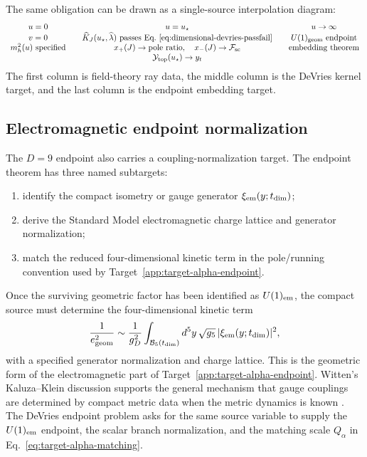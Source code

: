 The same obligation can be drawn as a single-source interpolation diagram:
\begin{equation}
\begin{array}{ccccc}
u=0 && u=u_\star && u\to\infty\\
v=0 && \widehat K_J(u_\star,\widehat\lambda)\ \hbox{passes Eq.~\eqref{eq:dimensional-devries-passfail}}
&& U(1)_{\rm geom}\ {\rm endpoint}\\
m_h^2(u)\ {\rm specified} &&
x_+(J)\to{\rm pole\ ratio},\quad x_-(J)\to\mathcal F_{\rm sc}
&& {\rm embedding\ theorem}\\
&& \mathcal Y_{\rm top}(u_\star)\to y_t &&
\end{array}
\label{eq:single-source-interpolation-diagram}
\end{equation}
The first column is field-theory ray data, the middle column is the DeVries
kernel target, and the last column is the endpoint embedding target.

\subsection{Electromagnetic endpoint normalization}
\label{app:electromagnetic-endpoint-normalization}

The \(D=9\) endpoint also carries a coupling-normalization target.  The
endpoint theorem has three named subtargets:
\begin{enumerate}
\item identify the compact isometry or gauge generator
  \(\xi_{\rm em}(y;t_{\rm dim})\);
\item derive the Standard Model electromagnetic charge lattice and generator
  normalization;
\item match the reduced four-dimensional kinetic term in the pole/running
  convention used by Target~\ref{app:target-alpha-endpoint}.
\end{enumerate}
Once the surviving geometric factor has been identified as \(U(1)_{\rm em}\),
the compact source must determine the four-dimensional kinetic term
\begin{equation}
  \frac{1}{e_{\rm geom}^2}
  \sim
  \frac{1}{g_D^2}
  \int_{\mathcal B_5(t_{\rm dim})}
  d^5y\,\sqrt{g_5}\,
  |\xi_{\rm em}(y;t_{\rm dim})|^2 ,
  \label{eq:em-endpoint-kinetic-normalization}
\end{equation}
with a specified generator normalization and charge lattice.  This is the
geometric form of the electromagnetic part of
Target~\ref{app:target-alpha-endpoint}.  Witten's Kaluza--Klein discussion
supports the general mechanism that gauge couplings are determined by compact
metric data when the metric dynamics is known \cite{WittenKK1981}.  The
DeVries endpoint problem asks for the same source variable to supply the
\(U(1)_{\rm em}\) endpoint, the scalar branch normalization, and the matching
scale \(Q_\alpha\) in Eq.~\eqref{eq:target-alpha-matching}.


